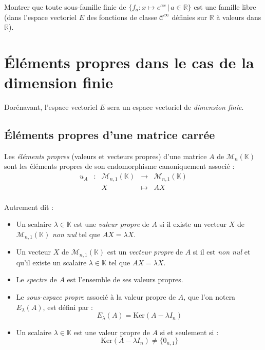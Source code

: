 \documentclass[a4paper,10pt]{report}
\begin{document}
\vspace{6cm}
\begin{exa} Montrer que toute sous-famille finie de $\lbrace f_a : x \mapsto e^{ax} \, \vert \, a \in \mathbb{R}\rbrace$ est une famille libre (dans l'espace vectoriel $E$ des fonctions de classe $\mathcal{C}^{\infty}$ définies sur $\mathbb{R}$ à valeurs dans $\mathbb{R}$).
\end{exa}
\section{Éléments propres dans le cas de la dimension finie}

\noindent Dorénavant, l'espace vectoriel $E$ sera un espace vectoriel de \textit{dimension finie}.

\subsection{Éléments propres d'une matrice carrée}

\begin{defin} Les \textit{éléments propres} (valeurs et vecteurs propres) d'une matrice $A$ de $\mathcal{M}_n(\mathbb{K})$ sont les éléments propres de son endomorphisme canoniquement associé :
$$ \begin{array}{ccccl}
u_A & : & \mathcal{M}_{n,1}(\mathbb{K}) & \rightarrow & \mathcal{M}_{n,1}(\mathbb{K}) \\
 & & X & \mapsto & AX \\
\end{array}$$
\end{defin}

\noindent Autrement dit : 

\begin{itemize}
\item Un scalaire $\lambda \in \mathbb{K}$ est une \textit{valeur propre} de $A$ si il existe un vecteur $X$ de $\mathcal{M}_{n,1}(\mathbb{K})$ \textit{non nul} tel que $AX= \lambda X$.
\item Un vecteur $X$ de $\mathcal{M}_{n,1}(\mathbb{K})$ est un \textit{vecteur propre} de $A$ si il est \textit{non nul} et qu'il existe un scalaire $\lambda \in \mathbb{K}$ tel que $AX=\lambda
X$.
\item Le \textit{spectre} de $A$ est l'ensemble de ses valeurs propres.
\item Le \textit{sous-espace propre} associé à la valeur propre de $A$, que l'on notera $E_{\lambda}(A)$, est défini par :
$$ E_{\lambda}(A) = \textrm{Ker}(A- \lambda I_n) $$
\item Un scalaire $\lambda \in \mathbb{K}$ est une valeur propre de $A$ si et seulement si :
$$ \textrm{Ker}(A- \lambda I_n) \neq \lbrace 0_{n,1} \rbrace$$
\end{itemize}
\end{document}
